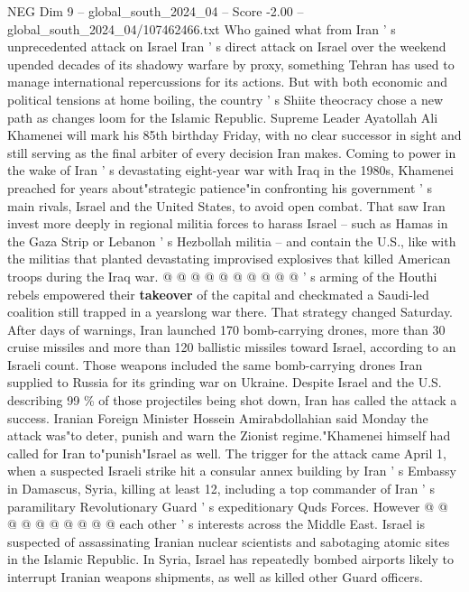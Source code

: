 \begin{textsample}{NEG Dim 9 – global\_south\_2024\_04 – Score -2.00 – global\_south\_2024\_04/107462466.txt}  \label{ex:f9_neg_378}
Who gained what from Iran ' s unprecedented attack on Israel Iran ' s direct attack on Israel over the weekend upended decades of its shadowy warfare by proxy, something Tehran has used to manage international repercussions for its actions.
But with both economic and political tensions at home boiling, the country ' s Shiite theocracy chose a new path as changes loom for the Islamic Republic.
Supreme Leader Ayatollah Ali Khamenei will mark his 85th birthday Friday, with no clear successor in sight and still serving as the final arbiter of every decision Iran makes.
Coming to power in the wake of Iran ' s devastating eight-year war with Iraq in the 1980s, Khamenei preached for years about"strategic patience"in confronting his government ' s main rivals, Israel and the United States, to avoid open combat.
That saw Iran invest more deeply in regional militia forces to harass Israel -- such as Hamas in the Gaza Strip or Lebanon ' s Hezbollah militia -- and contain the U.S., like with the militias that planted devastating improvised explosives that killed American troops during the Iraq war. @ @ @ @ @ @ @ @ @ @ ' s arming of the Houthi rebels empowered their \textbf{takeover} of the capital and checkmated a Saudi-led coalition still trapped in a yearslong war there.
That strategy changed Saturday.
After days of warnings, Iran launched 170 bomb-carrying drones, more than 30 cruise missiles and more than 120 ballistic missiles toward Israel, according to an Israeli count.
Those weapons included the same bomb-carrying drones Iran supplied to Russia for its grinding war on Ukraine.
Despite Israel and the U.S. describing 99 \% of those projectiles being shot down, Iran has called the attack a success.
Iranian Foreign Minister Hossein Amirabdollahian said Monday the attack was"to deter, punish and warn the Zionist regime."Khamenei himself had called for Iran to"punish"Israel as well.
The trigger for the attack came April 1, when a suspected Israeli strike hit a consular annex building by Iran ' s Embassy in Damascus, Syria, killing at least 12, including a top commander of Iran ' s paramilitary Revolutionary Guard ' s expeditionary Quds Forces.
However @ @ @ @ @ @ @ @ @ @ each other ' s interests across the Middle East.
Israel is suspected of assassinating Iranian nuclear scientists and sabotaging atomic sites in the Islamic Republic.
In Syria, Israel has repeatedly bombed airports likely to interrupt Iranian weapons shipments, as well as killed other Guard officers.

\end{textsample}
